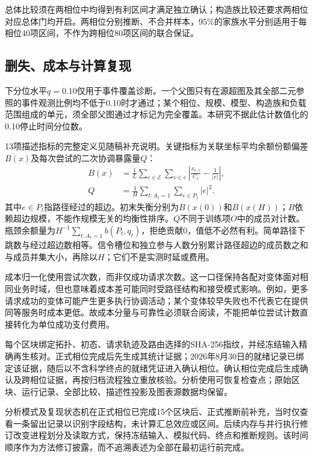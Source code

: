 \documentclass[UTF8,a4paper,twocolumn,fontset=none,zihao=5]{ctexart}
\begin{document}
总体比较须在两相位中均得到有利区间才满足独立确认；构造族比较还要求两相位对应总体门均开启。两相位分别推断、不合并样本，95\%的家族水平分别适用于每相位40项区间，不作为跨相位80项区间的联合保证。


\subsection{删失、成本与计算复现}

下分位水平$q=0.10$仅用于事件覆盖诊断。一个父图只有在源超图及其全部二元参照的事件观测比例均不低于0.10时才通过；某个相位、规模、模型、构造族和负载范围组成的单元，须全部父图通过才标记为完全覆盖。本研究不据此估计数值化的0.10停止时间分位数。


13项描述指标的完整定义见随稿补充说明。关键指标为关联坐标平均余额份额偏差$B(x)$及每次尝试的二次协调暴露量$Q$：
\[
\begin{aligned}
B(x)&=\frac1L\sum_{e\in\mathcal E}\sum_{v\in e}\left|\frac{x_{e,v}}{C_e}-\frac1{|e|}\right|,\\
Q&=\frac1H\sum_{t:A_t=1}\sum_{e\in P_t}|e|^2.
\end{aligned}
\]
其中$e\in P_t$指路径经过的超边。初末失衡分别为$B(x(0))$和$B(x(H))$；$B$依赖超边规模，不能作规模无关的均衡性排序。$Q$不同于训练项$O$中的成员对计数。瓶颈余额量为$H^{-1}\sum_{t:A_t=1}b(P_t,q_t)$，拒绝贡献0，值低不必然有利。简单路径下跳数与经过超边数相等。信令槽位和独立参与人数分别累计路径超边的成员数之和与成员并集大小，再除以$H$；它们不是实测时延或费用。


成本归一化使用尝试次数，而非仅成功请求次数。这一口径保持各配对变体面对相同业务时域，但也意味着成本差可能同时受路径结构和接受模式影响。例如，更多请求成功的变体可能产生更多执行协调活动；某个变体较早失败也不代表它在提供同等服务时成本更低。故成本分量与可靠性必须联合阅读，不能把单位尝试计数直接转化为单位成功支付费用。


每个区块绑定拓扑、初态、请求轨迹及路由选择的SHA-256指纹，并经冻结输入精确再生核对。正式相位完成后先生成其统计证据；2026年8月30日的就绪记录已绑定该证据，随后以不含科学终点的就绪凭证进入确认相位。确认相位完成后生成确认及跨相位证据，再按归档流程独立重放核验。分析使用可恢复检查点；原始区块、运行记录、全部比较、描述性投影及图表源数据均保留。


分析模式及复现状态机在正式相位已完成15个区块后、正式推断前补充，当时仅查看一条留出记录以识别字段结构，未计算汇总效应或区间。后续内存与并行执行修订改变进程划分及读取方式，保持冻结输入、模拟代码、终点和推断规则。该时间顺序作为方法修订披露，而不追溯表述为全部在最初运行前完成。
\end{document}
